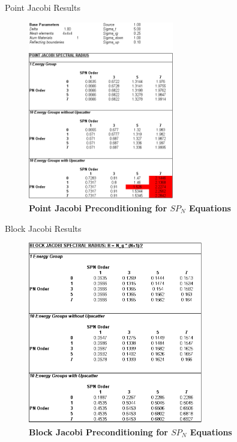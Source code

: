 \documentclass{beamer}
\begin{document}
\begin{frame}{Point Jacobi Results}

  \begin{figure}[h!]
    \centering
    \includegraphics[width=2.5in,clip]{point_jacobi_data.png}
    \caption{\textbf{Point Jacobi Preconditioning for $SP_N$ Equations}}
  \end{figure}
  
\end{frame}

\begin{frame}{Block Jacobi Results}

  \begin{figure}[h!]
    \centering
    \includegraphics[width=3in,clip]{block_jacobi_data.png}
    \caption{\textbf{Block Jacobi Preconditioning for $SP_N$ Equations}}
  \end{figure}
  
\end{frame}
\end{document}
